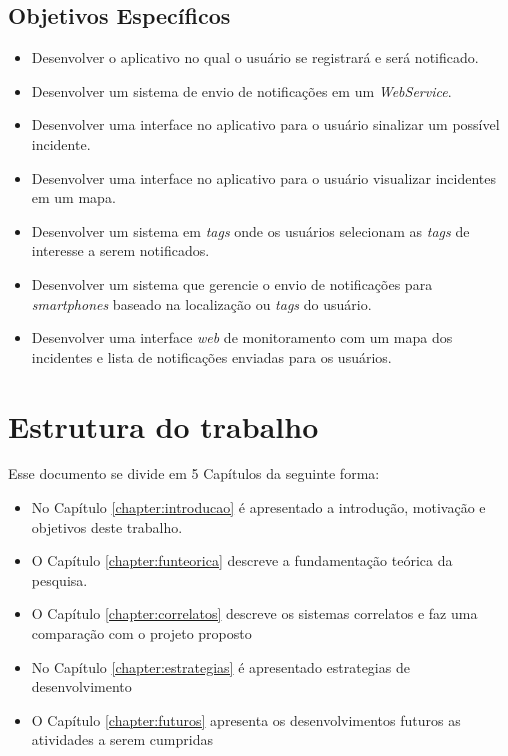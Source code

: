 \documentclass[	12pt, Times, openright, twoside, a4paper, english, brazil]{abntex2}
\begin{document}
\subsection{Objetivos Específicos}
\begin{itemize}
 \item Desenvolver o aplicativo no qual o usuário se registrará e será notificado.
 \item Desenvolver um sistema de envio de notificações em um \textit{WebService}.
 \item Desenvolver uma interface no aplicativo para o usuário sinalizar um possível incidente.
 \item Desenvolver uma interface no aplicativo para o usuário visualizar incidentes em um mapa. 
 \item Desenvolver um sistema em \textit{tags} onde os usuários selecionam as \textit{tags} de interesse a serem notificados.
 \item Desenvolver um sistema que gerencie o envio de notificações para \textit{smartphones} baseado na localização ou \textit{tags} do usuário.
 \item Desenvolver uma interface \textit{web} de monitoramento com um mapa dos incidentes e lista de notificações enviadas para os usuários.
\end{itemize}

\section{Estrutura do trabalho}
Esse documento se divide em 5 Capítulos da seguinte forma:

\begin{itemize}
\item No Capítulo \ref{chapter:introducao} é apresentado a introdução, motivação e objetivos deste trabalho.
\item O Capítulo \ref{chapter:funteorica} descreve a fundamentação teórica da pesquisa.
\item O Capítulo \ref{chapter:correlatos} descreve os sistemas correlatos e faz uma comparação com o projeto proposto
\item No Capítulo \ref{chapter:estrategias} é apresentado estrategias de desenvolvimento
\item O Capítulo \ref{chapter:futuros} apresenta os desenvolvimentos futuros as atividades a serem cumpridas
\end{itemize}

\end{document}
